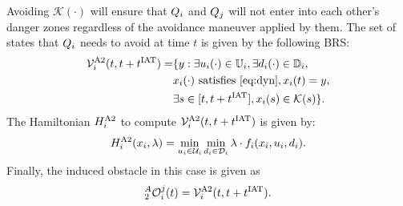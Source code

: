 \begin{itemize}[leftmargin=*]
Avoiding $\mathcal{K}(\cdot)$ will ensure that $Q_i$ and $Q_j$ will not enter into each other's danger zones regardless of the avoidance maneuver applied by them. The set of states that $Q_i$ needs to avoid at time $t$ is given by the following BRS: 
\begin{equation} \label{eq:ObsBRS_case2_caseA}
\begin{aligned}
\brs^{\text{A2}}_{i}(t, t+\iat) = & \{y: \exists \ctrl_i(\cdot) \in \cfset_i, \exists \dstb_i(\cdot) \in \dfset_i, \\
& \state_i(\cdot) \text{ satisfies \eqref{eq:dyn}}, \state_i(t) = y, \\
& \exists s \in [t, t+\iat], \state_i(s) \in \mathcal{K}(s) \}.
\end{aligned}
\end{equation}
The Hamiltonian $H^{\text{A2}}_{i}$ to compute $\mathcal{V}^{\text{A2}}_{i}(t, t+t^\text{IAT})$ is given by:
\begin{equation} \label{eqn:BRS_obsham_case2_caseA}
\ham^{\text{A2}}_{i}(\state_i, \costate) = \min_{\ctrl_i \in \cset_i} \min_{\dstb_i \in \dset_i} \costate \cdot f_i (\state_i, \ctrl_i, \dstb_i).
\end{equation}
Finally, the induced obstacle in this case is given as
\begin{equation} \label{eq:intruderObs_case2_caseA}
_2^A\ioset_i^j(t) = \brs^{\text{A2}}_{i}(t, t+\iat).
\end{equation}


\end{itemize}
